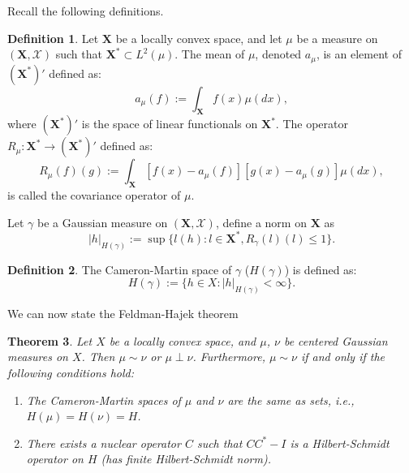 \documentclass[12pt]{amsart}
\newtheorem{theorem}{Theorem}[section]
\theoremstyle{definition}
\newtheorem{definition}[theorem]{Definition}
\theoremstyle{remark}
\newcommand{\ms}[1]{(\mathbf{#1},\mathcal{#1})}
\begin{document}
Recall the following definitions.
\begin{definition}
    Let $\mathbf{X}$ be a locally convex space, and let $\mu$  be a measure on $\ms{X}$ such that $\mathbf{X}^*\subset L^2(\mu)$. The mean of $\mu$, denoted $a_\mu$, is an element of $(\mathbf{X}^*)'$ defined as:
    \[
        a_\mu(f) := \int_\mathbf{X}f(x)\mu(dx),
    \]
    where $(\mathbf{X}^*)'$ is the space of linear functionals on $\mathbf{X}^*$.
    The operator $R_\mu:\mathbf{X}^*\to(\mathbf{X}^*)'$ defined as:
    \begin{equation}
        R_\mu(f)(g):=\int_\mathbf{X}[f(x)-a_\mu(f)][g(x)-a_\mu(g)]\mu(dx),
    \end{equation}
    is called the covariance operator of $\mu$.
\end{definition}

Let $\gamma$ be a Gaussian measure on $\ms{X}$, define a norm on $\mathbf{X}$ as
\[
    |h|_{H(\gamma)} := \sup\{l(h): l\in \mathbf{X}^*,R_\gamma(l)(l)\leq 1\}.
\]
\begin{definition}
    The Cameron-Martin space of $\gamma$ ($H(\gamma)$) is defined as:
\begin{equation}
    H(\gamma) :=\{h\in X: |h|_{H(\gamma)}<\infty\}.
\end{equation}
\end{definition}

We can now state the Feldman-Hajek theorem
\begin{theorem}\label{thm: feldman hajek}
    Let $X$ be a locally convex space, and $\mu$, $\nu$ be centered Gaussian measures on $X$. Then $\mu\sim\nu$ or $\mu\perp\nu$. Furthermore, $\mu\sim\nu$ if and only if the following conditions hold:
    \begin{enumerate}
        \item The Cameron-Martin spaces of $\mu$ and $\nu$ are the same as sets, i.e., $H(\mu) = H(\nu) = H$.
        \item There exists a nuclear operator $C$ such that $CC^*-I$ is a Hilbert-Schmidt operator on $H$ (has finite Hilbert-Schmidt norm).
    \end{enumerate}
\end{theorem}
\end{document}
